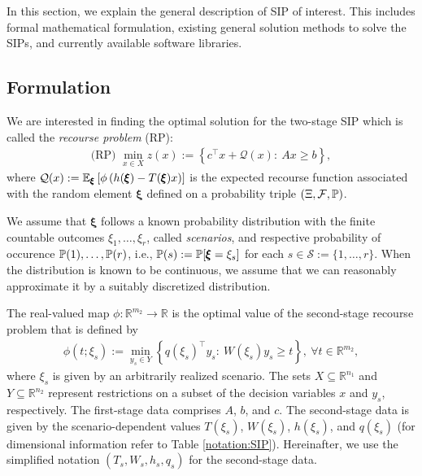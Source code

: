 In this section, we explain the general description of SIP of interest. This includes formal mathematical formulation, existing general solution methods to solve the SIPs, and currently available software libraries.
\subsection{Formulation}

We are interested in finding the optimal solution for the two-stage SIP which is called the \textit{recourse problem} (RP): 
\begin{align}
\textrm{(RP) }\min_{x\in X} z(x):={\left\{c^\top x + \mathcal{Q}(x):\ Ax\ge b\right\}}, \label{eq:SIP_1}
\end{align}
where $\mathcal{Q}(x):=\operatorname*{\mathbb{E}}_{\pmb{\xi}}\left[ \phi\left( h(\pmb{\xi})-T(\pmb{\xi})x \right) \right]$ is the expected recourse function associated with the random element $\pmb{\xi}$ defined on a probability triple $(\Xi, \mathcal{F},\operatorname*{\mathbb{P}})$.

We assume that $\pmb{\xi}$ follows a known probability distribution with the finite countable outcomes $\xi_1,\ldots,\xi_r$, called \textit{scenarios},  and respective probability of occurence $\operatorname*{\mathbb{P}}(1),\ldots,\operatorname*{\mathbb{P}}(r)$, i.e., $\operatorname*{\mathbb{P}}(s):=\operatorname*{\mathbb{P}}[\pmb{\xi}=\xi_s]$ for each $s\in\mathcal{S}:=\{1,\ldots,r\}$. When the distribution is known to be continuous, we assume that we can reasonably approximate it by a suitably discretized distribution. 

The real-valued map $\phi:\mathbb{R}^{m_2}\to\mathbb{R}$ is the optimal value of the second-stage recourse problem that is defined by
\begin{align}
\phi(t;{\xi_s}):=\min_{y_s\in Y}\left\{ q(\xi_s)^\top y_s:\ W(\xi_s)y_s \ge t \right\},\ \forall t\in\mathbb{R}^{m_2},
\end{align}
where $\xi_s$ is given by an arbitrarily realized scenario.
The sets $X\subseteq \mathbb{R}^{n_1}$ and $Y\subseteq\mathbb{R}^{n_2}$ represent restrictions on a subset of the decision variables $x$ and $y_s$, respectively. 
The first-stage data comprises $A$, $b$, and $c$. The second-stage data is given by the scenario-dependent values $T(\xi_s)$, $W(\xi_s)$, $h(\xi_s)$, and $q(\xi_s)$ (for dimensional information refer to Table \ref{notation:SIP}). Hereinafter, we use the simplified notation $(T_s,W_s,h_s,q_s)$ for the second-stage data. 

